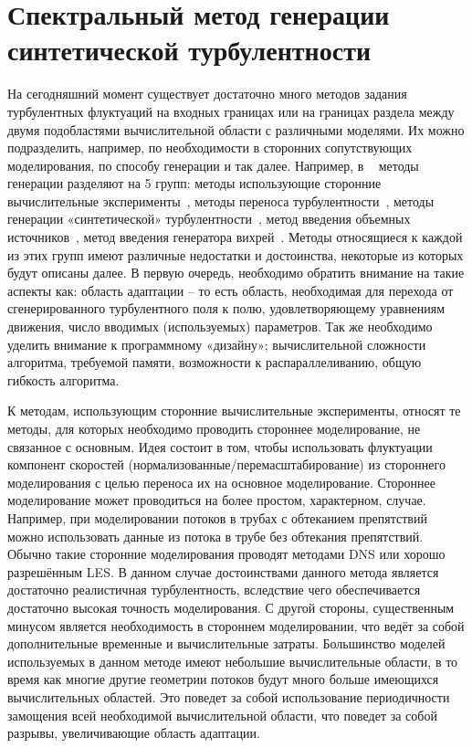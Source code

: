 \chapter{Спектральный метод генерации синтетической турбулентности} \label{chapt2}

На сегодняшний момент существует достаточно много методов задания турбулентных флуктуаций на входных границах или на границах раздела между двумя подобластями вычислительной области с различными моделями. Их можно подразделить, например, по необходимости в сторонних сопутствующих моделирования, по способу генерации и так далее. Например, в ~\cite{shur2014synthetic} методы генерации разделяют на 5 групп: методы использующие сторонние вычислительные эксперименты~\cite{schluter2004large}, методы переноса турбулентности~\cite{lund1998generation,spalart2006direct,shur2011rapid,araya2011dynamic}, методы генерации «синтетической» турбулентности~\cite{Kraichnan70,Smirnov2001,huang2010general,shur2014synthetic,adamian2011efficient,batten2004interfacing}, метод введения объемных источников~\cite{gritskevich2012embedded,spille2001generation}, метод введения генератора вихрей~\cite{terracol2016investigation}. Методы относящиеся к каждой из этих групп имеют различные недостатки и достоинства, некоторые из которых будут описаны далее. В первую очередь, необходимо обратить внимание на такие аспекты как: область адаптации – то есть область, необходимая для перехода от сгенерированного турбулентного поля к полю, удовлетворяющему уравнениям движения, число вводимых (используемых) параметров. Так же необходимо уделить внимание к программному «дизайну»; вычислительной сложности алгоритма, требуемой памяти, возможности к распараллеливанию, общую гибкость алгоритма. 

К методам, использующим сторонние вычислительные эксперименты, относят те методы, для которых необходимо проводить стороннее моделирование, не связанное с основным. Идея состоит в том, чтобы использовать флуктуации компонент скоростей (нормализованные/перемасштабирование) из стороннего моделирования с целью переноса их на основное моделирование. Стороннее моделирование может проводиться на более простом, характерном, случае. Например, при моделировании потоков в трубах с обтеканием препятствий можно использовать данные из потока в трубе без обтекания препятствий. Обычно такие сторонние моделирования проводят методами DNS или хорошо разрешённым LES. В данном случае достоинствами данного метода является достаточно реалистичная турбулентность, вследствие чего обеспечивается достаточно высокая точность моделирования. С другой стороны, существенным минусом является необходимость в стороннем моделировании, что ведёт за собой дополнительные временные и вычислительные затраты. Большинство моделей используемых в данном методе имеют небольшие вычислительные области, в то время как многие другие геометрии потоков будут много больше имеющихся вычислительных областей. Это поведет за собой использование периодичности замощения всей необходимой вычислительной области, что поведет за собой разрывы, увеличивающие область адаптации. 

